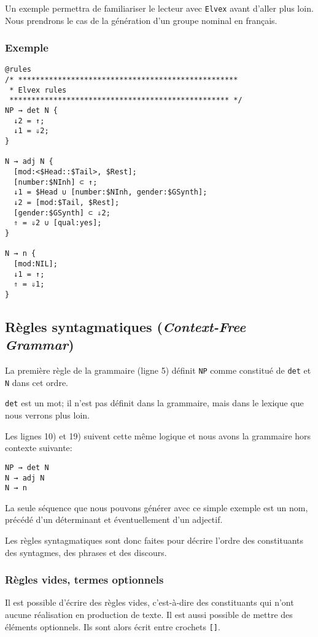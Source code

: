 \documentclass[11pt]{article}
\begin{document}
Un exemple permettra de familiariser le lecteur avec \texttt{Elvex}
avant d'aller plus loin. Nous prendrons le cas de la génération d'un
groupe nominal en français.

\subsubsection*{Exemple}

\begin{lstlisting}
@rules
/* **************************************************
 * Elvex rules
 ************************************************** */
NP → det N {
  ↓2 = ↑;
  ↓1 = ⇓2;
}

N → adj N {
  [mod:<$Head::$Tail>, $Rest];
  [number:$NInh] ⊂ ↑;
  ↓1 = $Head ∪ [number:$NInh, gender:$GSynth];
  ↓2 = [mod:$Tail, $Rest];
  [gender:$GSynth] ⊂ ⇓2;
  ⇑ = ⇓2 ∪ [qual:yes];
}

N → n {
  [mod:NIL];
  ↓1 = ↑;
  ⇑ = ⇓1;
}
\end{lstlisting}

\subsection{Règles syntagmatiques (\textit{Context-Free Grammar})}
 
La première règle de la grammaire (ligne 5) définit \texttt{NP} comme
constitué de \texttt{det} et \texttt{N} dans cet ordre.

\texttt{det} est un mot; il n'est pas définit dans la grammaire, mais
dans le lexique que nous verrons plus loin.

Les lignes 10) et 19) suivent cette même logique et nous avons la
grammaire hors contexte suivante:

\begin{lstlisting}[numbers=none]
NP → det N
N → adj N
N → n
\end{lstlisting}

La seule séquence que nous pouvons générer avec ce simple exemple est
un nom, précédé d'un déterminant et éventuellement d'un adjectif.

Les règles syntagmatiques sont donc faites pour décrire l'ordre des
constituants des syntagmes, des phrases et des discours.

\subsubsection*{Règles vides, termes optionnels}
 
Il est possible d'écrire des règles vides, c'est-à-dire des
constituants qui n'ont aucune réalisation en production de texte. Il
est aussi possible de mettre des éléments optionnels. Ils sont alors
écrit entre crochets \verb#[]#.
\end{document}
